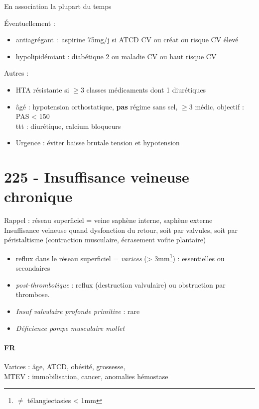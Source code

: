 En association la plupart du temps

Éventuellement :
\begin{itemize}
  \item antiagrégant : aspirine 75mg/j si ATCD CV ou créat ou risque CV élevé
  \item hypolipidémiant : diabétique 2 ou maladie CV ou haut risque CV
\end{itemize}

Autres :
\begin{itemize}
  \item HTA résistante si $\ge 3$ classes médicaments dont 1 diurétiques
  \item âgé : \danger{} hypotension orthostatique, \textbf{pas} régime sans sel,
    $\ge 3$ médic, objectif : PAS < 150\\
    ttt : diurétique, calcium bloqueurs
  \item Urgence : éviter baisse brutale tension et hypotension \skull
\end{itemize}
\section{225 - Insuffisance veineuse chronique}%
\label{sec:225_insuffisance_veineuse_chronique}

Rappel : réseau superficiel = veine saphène interne, saphène externe\\
Insuffisance veineuse quand dysfonction du retour, soit par valvules, soit par
péristaltisme (contraction musculaire, écrasement voûte plantaire)

\begin{itemize}
  \item reflux dans le réseau superficiel = \textit{varices}  (>
    3mm\footnote{$\neq$ télangiectasies < 1mm}) : essentielles ou
    secondaires
  \item \textit{post-thrombotique} : reflux (destruction valvulaire) ou obstruction par thrombose. 
  \item \textit{Insuf valvulaire profonde primitive} : rare
  \item \textit{Déficience pompe musculaire mollet} 
\end{itemize}

\paragraph{FR} Varices : âge, ATCD, obésité, grossesse, \female\\
MTEV : immobilisation, cancer, anomalies hémostase

